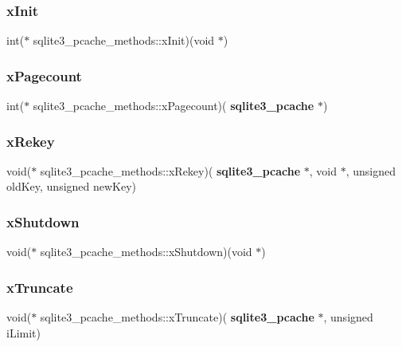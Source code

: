 \mbox{\label{structsqlite3__pcache__methods_ab5f54101f6060de1af0c87b2456231ad}} 
\subsubsection{xInit}
{\footnotesize\ttfamily int($\ast$ sqlite3\+\_\+pcache\+\_\+methods\+::x\+Init)(void $\ast$)}

\mbox{\label{structsqlite3__pcache__methods_a0ab192dc811798e8f17c445dbf379989}} 
\subsubsection{xPagecount}
{\footnotesize\ttfamily int($\ast$ sqlite3\+\_\+pcache\+\_\+methods\+::x\+Pagecount)(\textbf{ sqlite3\+\_\+pcache} $\ast$)}

\mbox{\label{structsqlite3__pcache__methods_adc5552190f1de86eb95d91e9cf8430e6}} 
\subsubsection{xRekey}
{\footnotesize\ttfamily void($\ast$ sqlite3\+\_\+pcache\+\_\+methods\+::x\+Rekey)(\textbf{ sqlite3\+\_\+pcache} $\ast$, void $\ast$, unsigned old\+Key, unsigned new\+Key)}

\mbox{\label{structsqlite3__pcache__methods_aa88bb238d288631e7e06f4da232c3dbb}} 
\subsubsection{xShutdown}
{\footnotesize\ttfamily void($\ast$ sqlite3\+\_\+pcache\+\_\+methods\+::x\+Shutdown)(void $\ast$)}

\mbox{\label{structsqlite3__pcache__methods_aad73f9335999770bcd2dc6a2d914b4f0}} 
\subsubsection{xTruncate}
{\footnotesize\ttfamily void($\ast$ sqlite3\+\_\+pcache\+\_\+methods\+::x\+Truncate)(\textbf{ sqlite3\+\_\+pcache} $\ast$, unsigned i\+Limit)}

